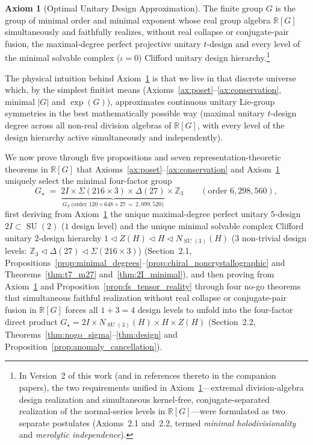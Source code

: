\documentclass[11pt,a4paper]{article}
\theoremstyle{definition}
\newtheorem{axiom}[theorem]{Axiom}
\theoremstyle{remark}
\newcommand{\R}{\mathbb{R}}
\newcommand{\Z}{\mathbb{Z}}
\newcommand{\SU}{\operatorname{SU}}
\newcommand{\Gthree}{G_3}
\newcommand{\Gstar}{G_\star}
\begin{document}
\begin{axiom}[Optimal Unitary Design Approximation]
\label{ax:unitary_design}
The finite group $G$ is the group of minimal order and minimal exponent whose real group algebra $\R[G]$ simultaneously and faithfully realizes, without real collapse or conjugate-pair fusion, the maximal-degree perfect projective unitary $t$-design and every level of the minimal solvable complex ($\iota = 0$) Clifford unitary design hierarchy.\footnote{In Version~2 of this work (and in references thereto in the companion papers), the two requirements unified in Axiom~\ref{ax:unitary_design}---extremal division-algebra design realization and simultaneous kernel-free, conjugate-separated realization of the normal-series levels in $\R[G]$---were formulated as two separate postulates (Axioms~2.1 and~2.2, termed \emph{minimal holodivisionality} and \emph{merolytic independence}).}
\end{axiom}

The physical intuition behind Axiom~\ref{ax:unitary_design} is that we live in that discrete universe which, by the simplest finitist means (Axioms~\ref{ax:poset}--\ref{ax:conservation}, minimal $|G|$ and $\exp(G)$), approximates continuous unitary Lie-group symmetries in the best mathematically possible way (maximal unitary $t$-design degree across all non-real division algebras of $\R[G]$, with every level of the design hierarchy active simultaneously and independently).

\bigskip
\noindent We now prove through five propositions and seven representation-theoretic theorems in $\R[G]$ that Axioms~\ref{ax:poset}--\ref{ax:conservation} and Axiom~\ref{ax:unitary_design} uniquely select the minimal four-factor group
\begin{equation}
\label{eq:gstar_def}
\Gstar \;=\; \underbrace{2I \times \Sigma(216 \times 3) \times \Delta(27)}_{\Gthree\;\text{(order }120 \times 648 \times 27 \,=\, 2{,}099{,}520\text{)}} \times \Z_3 \qquad (\text{order } 6{,}298{,}560),
\end{equation}
first deriving from Axiom~\ref{ax:unitary_design} the unique maximal-degree perfect unitary $5$-design $2I \subset \SU(2)$ ($1$ design level) and the unique minimal solvable complex Clifford unitary $2$-design hierarchy $1 \triangleleft Z(H) \triangleleft H \triangleleft N_{\SU(3)}(H)$ ($3$ non-trivial design levels: $\Z_3 \triangleleft \Delta(27) \triangleleft \Sigma(216 \times 3)$) (Section~2.1, Propositions~\ref{prop:minimal_degrees}--\ref{prop:chiral_noncrystallographic} and Theorems~\ref{thm:t7_m27} and~\ref{thm:2I_minimal}), and then proving from Axiom~\ref{ax:unitary_design} and Proposition~\ref{prop:fs_tensor_reality} through four no-go theorems that simultaneous faithful realization without real collapse or conjugate-pair fusion in $\R[G]$ forces all $1 + 3 = 4$ design levels to unfold into the four-factor direct product $\Gstar = 2I \times N_{\SU(3)}(H) \times H \times Z(H)$ (Section~2.2, Theorems~\ref{thm:nogo_sigma}--\ref{thm:design} and Proposition~\ref{prop:anomaly_cancellation}).
\end{document}
